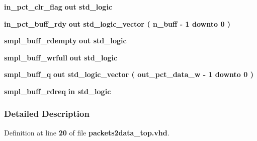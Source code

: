 \begin{DoxyCompactItemize}
\item 
{\bf in\+\_\+pct\+\_\+clr\+\_\+flag}  {\bfseries {\bfseries \textcolor{keywordflow}{out}\textcolor{vhdlchar}{ }}} {\bfseries \textcolor{comment}{std\+\_\+logic}\textcolor{vhdlchar}{ }} 
\item 
{\bf in\+\_\+pct\+\_\+buff\+\_\+rdy}  {\bfseries {\bfseries \textcolor{keywordflow}{out}\textcolor{vhdlchar}{ }}} {\bfseries \textcolor{comment}{std\+\_\+logic\+\_\+vector}\textcolor{vhdlchar}{ }\textcolor{vhdlchar}{(}\textcolor{vhdlchar}{ }\textcolor{vhdlchar}{ }\textcolor{vhdlchar}{ }\textcolor{vhdlchar}{ }{\bfseries {\bf n\+\_\+buff}} \textcolor{vhdlchar}{-\/}\textcolor{vhdlchar}{ } \textcolor{vhdldigit}{1} \textcolor{vhdlchar}{ }\textcolor{keywordflow}{downto}\textcolor{vhdlchar}{ }\textcolor{vhdlchar}{ } \textcolor{vhdldigit}{0} \textcolor{vhdlchar}{ }\textcolor{vhdlchar}{)}\textcolor{vhdlchar}{ }} 
\item 
{\bf smpl\+\_\+buff\+\_\+rdempty}  {\bfseries {\bfseries \textcolor{keywordflow}{out}\textcolor{vhdlchar}{ }}} {\bfseries \textcolor{comment}{std\+\_\+logic}\textcolor{vhdlchar}{ }} 
\item 
{\bf smpl\+\_\+buff\+\_\+wrfull}  {\bfseries {\bfseries \textcolor{keywordflow}{out}\textcolor{vhdlchar}{ }}} {\bfseries \textcolor{comment}{std\+\_\+logic}\textcolor{vhdlchar}{ }} 
\item 
{\bf smpl\+\_\+buff\+\_\+q}  {\bfseries {\bfseries \textcolor{keywordflow}{out}\textcolor{vhdlchar}{ }}} {\bfseries \textcolor{comment}{std\+\_\+logic\+\_\+vector}\textcolor{vhdlchar}{ }\textcolor{vhdlchar}{(}\textcolor{vhdlchar}{ }\textcolor{vhdlchar}{ }\textcolor{vhdlchar}{ }\textcolor{vhdlchar}{ }{\bfseries {\bf out\+\_\+pct\+\_\+data\+\_\+w}} \textcolor{vhdlchar}{-\/}\textcolor{vhdlchar}{ } \textcolor{vhdldigit}{1} \textcolor{vhdlchar}{ }\textcolor{keywordflow}{downto}\textcolor{vhdlchar}{ }\textcolor{vhdlchar}{ } \textcolor{vhdldigit}{0} \textcolor{vhdlchar}{ }\textcolor{vhdlchar}{)}\textcolor{vhdlchar}{ }} 
\item 
{\bf smpl\+\_\+buff\+\_\+rdreq}  {\bfseries {\bfseries \textcolor{keywordflow}{in}\textcolor{vhdlchar}{ }}} {\bfseries \textcolor{comment}{std\+\_\+logic}\textcolor{vhdlchar}{ }} 
\end{DoxyCompactItemize}


\subsubsection{Detailed Description}


Definition at line {\bf 20} of file {\bf packets2data\+\_\+top.\+vhd}.



